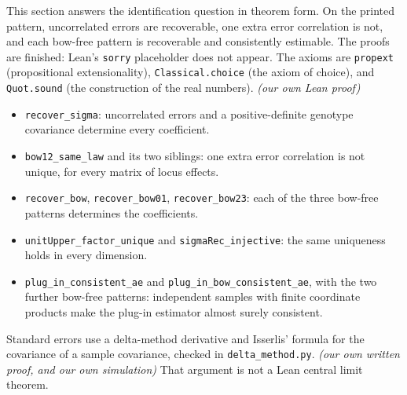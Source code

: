 \documentclass[11pt]{article}
\newcommand{\ev}[1]{\textup{\emph{(#1)}}}
\begin{document}
This section answers the identification question in theorem form. On the
printed pattern, uncorrelated errors are recoverable, one extra error
correlation is not, and each bow-free pattern is recoverable and consistently
estimable. The proofs are finished: Lean's \texttt{sorry} placeholder does
not appear. The axioms are \texttt{propext} (propositional extensionality),
\texttt{Classical.choice} (the axiom of choice), and \texttt{Quot.sound}
(the construction of the real numbers). \ev{our own Lean proof}
\begin{itemize}
\item \texttt{recover\_sigma}: uncorrelated errors and a positive-definite
genotype covariance determine every coefficient.
\item \texttt{bow12\_same\_law} and its two siblings: one extra error
correlation is not unique, for every matrix of locus effects.
\item \texttt{recover\_bow}, \texttt{recover\_bow01}, \texttt{recover\_bow23}:
each of the three bow-free patterns determines the coefficients.
\item \texttt{unitUpper\_factor\_unique} and \texttt{sigmaRec\_injective}:
the same uniqueness holds in every dimension.
\item \texttt{plug\_in\_consistent\_ae} and
\texttt{plug\_in\_bow\_consistent\_ae}, with the two further bow-free
patterns: independent samples with finite coordinate products make the
plug-in estimator almost surely consistent.
\end{itemize}
Standard errors use a delta-method derivative and Isserlis' formula for the
covariance of a sample covariance, checked in \texttt{delta\_method.py}.
\ev{our own written proof, and our own simulation}
That argument is not a Lean central limit theorem.
\end{document}
